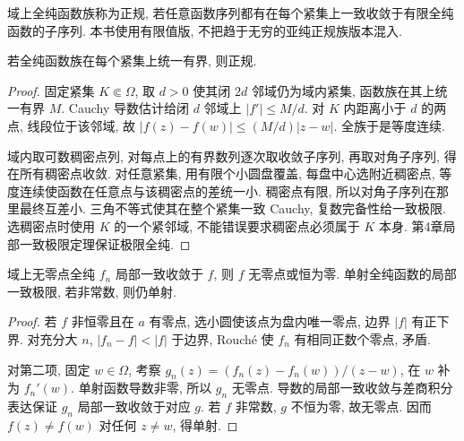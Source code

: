 \begin{definition}
域上全纯函数族称为正规, 若任意函数序列都有在每个紧集上一致收敛于有限全纯函数的子序列. 本书使用有限值版, 不把趋于无穷的亚纯正规族版本混入.
\end{definition}
\begin{theorem}[Montel]\label{thm:montel}
若全纯函数族在每个紧集上统一有界, 则正规.
\end{theorem}
\begin{proof}
固定紧集 $K\Subset\Omega$, 取 $d>0$ 使其闭 $2d$ 邻域仍为域内紧集, 函数族在其上统一有界 $M$. Cauchy 导数估计给闭 $d$ 邻域上 $|f'|\le M/d$. 对 $K$ 内距离小于 $d$ 的两点, 线段位于该邻域, 故 $|f(z)-f(w)|\le(M/d)|z-w|$. 全族于是等度连续.

域内取可数稠密点列, 对每点上的有界数列逐次取收敛子序列, 再取对角子序列, 得在所有稠密点收敛. 对任意紧集, 用有限个小圆盘覆盖, 每盘中心选附近稠密点, 等度连续使函数在任意点与该稠密点的差统一小. 稠密点有限, 所以对角子序列在那里最终互差小. 三角不等式使其在整个紧集一致 Cauchy, 复数完备性给一致极限. 选稠密点时使用 $K$ 的一个紧邻域, 不能错误要求稠密点必须属于 $K$ 本身. 第4章局部一致极限定理保证极限全纯.
\end{proof}
\begin{theorem}[Hurwitz]\label{thm:hurwitz}
域上无零点全纯 $f_n$ 局部一致收敛于 $f$, 则 $f$ 无零点或恒为零. 单射全纯函数的局部一致极限, 若非常数, 则仍单射.
\end{theorem}
\begin{proof}
若 $f$ 非恒零且在 $a$ 有零点, 选小圆使该点为盘内唯一零点, 边界 $|f|$ 有正下界. 对充分大 $n$, $|f_n-f|<|f|$ 于边界, Rouché 使 $f_n$ 有相同正数个零点, 矛盾.

对第二项, 固定 $w\in\Omega$, 考察 $g_n(z)=(f_n(z)-f_n(w))/(z-w)$, 在 $w$ 补为 $f_n'(w)$. 单射函数导数非零, 所以 $g_n$ 无零点. 导数的局部一致收敛与差商积分表达保证 $g_n$ 局部一致收敛于对应 $g$. 若 $f$ 非常数, $g$ 不恒为零, 故无零点. 因而 $f(z)\ne f(w)$ 对任何 $z\ne w$, 得单射.
\end{proof}

